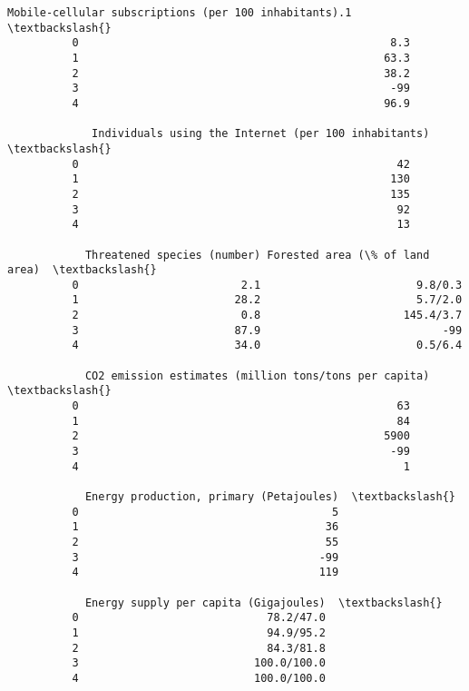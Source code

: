 \documentclass[11pt]{article}
\begin{document}
\begin{Verbatim}[commandchars=\\\{\}]
             Mobile-cellular subscriptions (per 100 inhabitants).1  \textbackslash{}
          0                                                8.3       
          1                                               63.3       
          2                                               38.2       
          3                                                -99       
          4                                               96.9       
          
             Individuals using the Internet (per 100 inhabitants)  \textbackslash{}
          0                                                 42      
          1                                                130      
          2                                                135      
          3                                                 92      
          4                                                 13      
          
            Threatened species (number) Forested area (\% of land area)  \textbackslash{}
          0                         2.1                        9.8/0.3   
          1                        28.2                        5.7/2.0   
          2                         0.8                      145.4/3.7   
          3                        87.9                            -99   
          4                        34.0                        0.5/6.4   
          
            CO2 emission estimates (million tons/tons per capita)  \textbackslash{}
          0                                                 63      
          1                                                 84      
          2                                               5900      
          3                                                -99      
          4                                                  1      
          
            Energy production, primary (Petajoules)  \textbackslash{}
          0                                       5   
          1                                      36   
          2                                      55   
          3                                     -99   
          4                                     119   
          
            Energy supply per capita (Gigajoules)  \textbackslash{}
          0                             78.2/47.0   
          1                             94.9/95.2   
          2                             84.3/81.8   
          3                           100.0/100.0   
          4                           100.0/100.0   
          

\end{Verbatim}
\end{document}
